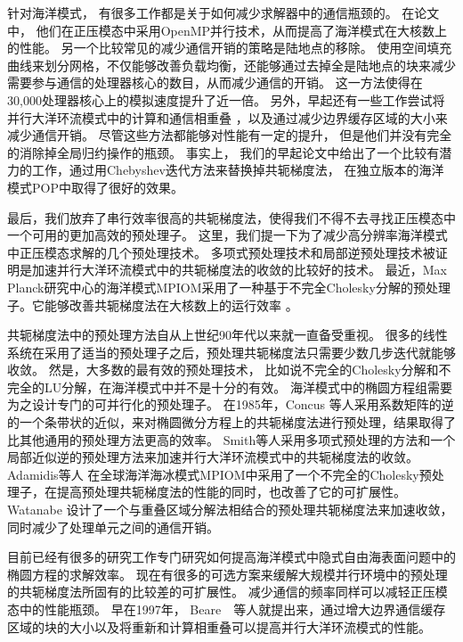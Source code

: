 针对海洋模式， 有很多工作都是关于如何减少求解器中的通信瓶颈的。 
在论文\cite{Worley:2011:PCE:2063384.2063457}中， 他们在正压模态中采用OpenMP并行技术，从而提高了海洋模式在大核数上的性能。 
另一个比较常见的减少通信开销的策略是陆地点的移除\cite{dennis2007inverse,dennis2008scaling}。 
使用空间填充曲线来划分网格，不仅能够改善负载均衡，还能够通过去掉全是陆地点的块来减少需要参与通信的处理器核心的数目，从而减少通信的开销。 
这一方法使得在30,000处理器核心上的模拟速度提升了近一倍。 
另外，早起还有一些工作尝试将并行大洋环流模式中的计算和通信相重叠 \cite{beare1997optimisation}，以及通过减少边界缓存区域的大小来减少通信开销。 
尽管这些方法都能够对性能有一定的提升， 但是他们并没有完全的消除掉全局归约操作的瓶颈。 
事实上， 我们的早起论文中给出了一个比较有潜力的工作，通过用Chebyshev迭代方法来替换掉共轭梯度法，
在独立版本的海洋模式POP中取得了很好的效果。 

 
最后，我们放弃了串行效率很高的共轭梯度法，使得我们不得不去寻找正压模态中一个可用的更加高效的预处理子。 
这里，我们提一下为了减少高分辨率海洋模式中正压模态求解的几个预处理技术。 
多项式预处理技术和局部逆预处理技术被证明是加速并行大洋环流模式中的共轭梯度法的收敛的比较好的技术\cite{smith1992parallel}。 
最近，Max Planck研究中心的海洋模式MPIOM采用了一种基于不完全Cholesky分解的预处理子。它能够改善共轭梯度法在大核数上的运行效率 \cite{adamidis2011high}。


  
共轭梯度法中的预处理方法自从上世纪90年代以来就一直备受重视。 
很多的线性系统在采用了适当的预处理子之后，预处理共轭梯度法只需要少数几步迭代就能够收敛。 
然是，大多数的最有效的预处理技术， 比如说不完全的Cholesky分解和不完全的LU分解，在海洋模式中并不是十分的有效。 
海洋模式中的椭圆方程组需要为之设计专门的可并行化的预处理子。 
在1985年，Concus 等人\cite{concus1985block}采用系数矩阵的逆的一个条带状的近似，来对椭圆微分方程上的共轭梯度法进行预处理，结果取得了比其他通用的预处理方法更高的效率。 
Smith等人\cite{smith1992parallel}采用多项式预处理的方法和一个局部近似逆的预处理方法来加速并行大洋环流模式中的共轭梯度法的收敛。 
Adamidis等人 \cite{adamidis2011high} 在全球海洋海冰模式MPIOM中采用了一个不完全的Cholesky预处理子，在提高预处理共轭梯度法的性能的同时，也改善了它的可扩展性。 
Watanabe \cite{Watanabe2006pcg} 设计了一个与重叠区域分解法相结合的预处理共轭梯度法来加速收敛，同时减少了处理单元之间的通信开销。 




    
目前已经有很多的研究工作专门研究如何提高海洋模式中隐式自由海表面问题中的椭圆方程的求解效率。 
现在有很多的可选方案来缓解大规模并行环境中的预处理的共轭梯度法所固有的比较差的可扩展性。 
 减少通信的频率同样可以减轻正压模态中的性能瓶颈。 
 早在1997年，  Beare　\cite{beare1997optimisation}等人就提出来，通过增大边界通信缓存区域的块的大小以及将重新和计算相重叠可以提高并行大洋环流模式的性能。 
  

